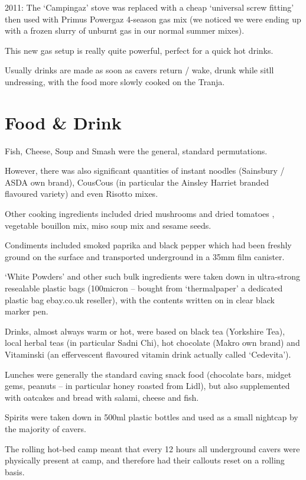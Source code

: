 2011: The `Campingaz' stove was replaced with a cheap `universal screw
fitting' then used with Primus Powergaz 4-season gas mix (we noticed we
were ending up with a frozen slurry of unburnt gas in our normal summer
mixes).

This new gas setup is really quite powerful, perfect for a quick hot
drinks.

Usually drinks are made as soon as cavers return / wake, drunk while
sitll undressing, with the food more slowly cooked on the Tranja.

\section{Food \& Drink}\label{food-drink}

Fish, Cheese, Soup and Smash were the general, standard permutations.

However, there was also significant quantities of instant noodles
(Sainsbury / ASDA own brand), CousCous (in particular the Ainsley
Harriet branded flavoured variety) and even Risotto mixes.

Other cooking ingredients included dried mushrooms and dried tomatoes ,
vegetable bouillon mix, miso soup mix and sesame seeds.

Condiments included smoked paprika and black pepper which had been
freshly ground on the surface and transported underground in a 35mm film
canister.

`White Powders' and other such bulk ingredients were taken down in
ultra-strong resealable plastic bags (100micron -- bought from
`thermalpaper' a dedicated plastic bag ebay.co.uk reseller), with the
contents written on in clear black marker pen.

Drinks, almost always warm or hot, were based on black tea (Yorkshire
Tea), local herbal teas (in particular Sadni Chi), hot chocolate (Makro
own brand) and Vitaminski (an effervescent flavoured vitamin drink
actually called `Cedevita').

Lunches were generally the standard caving snack food (chocolate bars,
midget gems, peanuts -- in particular honey roasted from Lidl), but also
supplemented with oatcakes and bread with salami, cheese and fish.

Spirits were taken down in 500ml plastic bottles and used as a small
nightcap by the majority of cavers.

The rolling hot-bed camp meant that every 12 hours all underground
cavers were physically present at camp, and therefore had their callouts
reset on a rolling basis.


